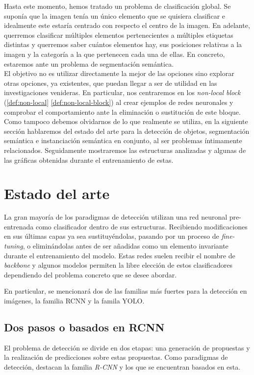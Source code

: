 Hasta este momento, hemos tratado un problema de clasificación global. Se suponía que la imagen tenía un único elemento que se quisiera clasificar e idealmente este estaría centrado con respecto el centro de la imagen. En adelante, querremos clasificar múltiples elementos pertenecientes a múltiples etiquetas distintas y querremos saber cuántos elementos hay, sus posiciones relativas a la imagen y la categoría a la que pertenecen cada una de ellas. En concreto, estaremos ante un problema de segmentación semántica.\\

El objetivo no es utilizar directamente la mejor de las opciones sino explorar otras opciones, ya existentes, que puedan llegar a ser de utilidad en las investigaciones venideras. En particular, nos centraremos en los \emph{non-local block} (\autoref{def:non-local} \autoref{def:non-local-block}) al crear ejemplos de redes neuronales y comprobar el comportamiento ante la eliminación o sustitución de este bloque.\\

Como tampoco debemos olvidarnos de lo que realmente se utiliza, en la siguiente sección hablaremos del estado del arte para la detección de objetos, segmentación semántica e instanciación semántica en conjunto, al ser problemas íntimamente relacionados. Seguidamente mostraremos las estructuras analizadas y algunas de las gráficas obtenidas durante el entrenamiento de estas.

\chapter{Estado del arte}
La gran mayoría de los paradigmas de detección utilizan una red neuronal pre-entrenada como clasificador dentro de sus estructuras. Recibiendo modificaciones en sus últimas capas ya sea sustituyéndolas, pasando por un proceso de \emph{fine-tuning}, o eliminándolas antes de ser añadidas como un elemento invariante durante el entrenamiento del modelo. Estas redes suelen recibir el nombre de \emph{backbone} y algunos modelos permiten la libre elección de estos clasificadores dependiendo del problema concreto que se desee abordar.\newline

En particular, se mencionará dos de las familias más fuertes para la detección en imágenes, la familia RCNN y la famila YOLO.

\section{Dos pasos o basados en RCNN}
El problema de detección se divide en dos etapas: una generación de propuestas y la realización de predicciones sobre estas propuestas. Como paradigmas de detección, destacan la familia \emph{R-CNN} y los que se encuentran basados en esta.\newline

